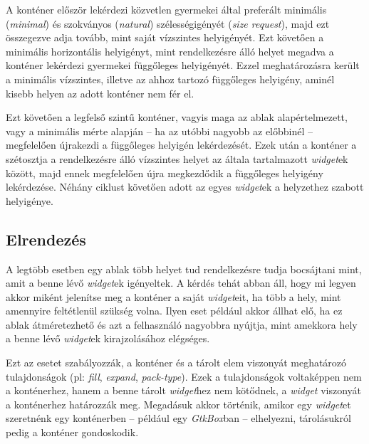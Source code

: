 A konténer először lekérdezi közvetlen gyermekei által preferált minimális (\textit{minimal}) és szokványos (\textit{natural}) szélességigényét (\textit{size request}), majd ezt összegezve adja tovább, mint saját vízszintes helyigényét. Ezt követően a minimális horizontális helyigényt, mint rendelkezésre álló helyet megadva a konténer lekérdezi gyermekei függőleges helyigényét. Ezzel meghatározásra került a minimális vízszintes, illetve az ahhoz tartozó függőleges helyigény, aminél kisebb helyen az adott konténer nem fér el.

Ezt követően a legfelső szintű konténer, vagyis maga az ablak alapértelmezett, vagy a minimális mérte alapján -- ha az utóbbi nagyobb az előbbinél -- megfelelően újrakezdi a függőleges helyigén lekérdezését. Ezek után a konténer a szétosztja a rendelkezésre álló vízszintes helyet az általa tartalmazott \textit{widget}ek között, majd ennek megfelelően újra megkezdődik a függőleges helyigény lekérdezése. Néhány ciklust követően adott az egyes \textit{widget}ek a helyzethez szabott helyigénye.

\subsection{Elrendezés}

A legtöbb esetben egy ablak több helyet tud rendelkezésre tudja bocsájtani mint, amit a benne lévő \textit{widget}ek igényeltek. A kérdés tehát abban áll, hogy mi legyen akkor miként jelenítse meg a konténer a saját \textit{widget}eit, ha több a hely, mint amennyire feltétlenül szükség volna. Ilyen eset például akkor állhat elő, ha ez ablak átméretezhető és azt a felhasználó nagyobbra nyújtja, mint amekkora hely a benne lévő \textit{widget}ek kirajzolásához elégséges.

Ezt az esetet szabályozzák, a konténer és a tárolt elem viszonyát meghatározó tulajdonságok (pl: \textit{fill}, \textit{expand}, \textit{pack-type}). Ezek a tulajdonságok voltaképpen nem a konténerhez, hanem a benne tárolt \textit{widget}hez nem kötődnek, a \textit{widget} viszonyát a konténerhez határozzák meg. Megadásuk akkor történik, amikor egy \textit{widget}et szeretnénk egy konténerben -- például egy \textit{GtkBox}ban -- elhelyezni, tárolásukról pedig a konténer gondoskodik.

